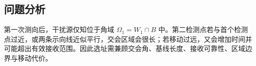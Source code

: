 \subsection{问题分析}

第一次测向后，干扰源仅知位于角域 \(\Omega_1=W_1\cap B\) 中。第二检测点若与首个检测点过近，或两条示向线近似平行，交会区域会很长；若移动过远，又会增加时间并可能超出有效接收范围。因此选址需兼顾交会角、基线长度、接收可靠性、区域边界与移动代价。

